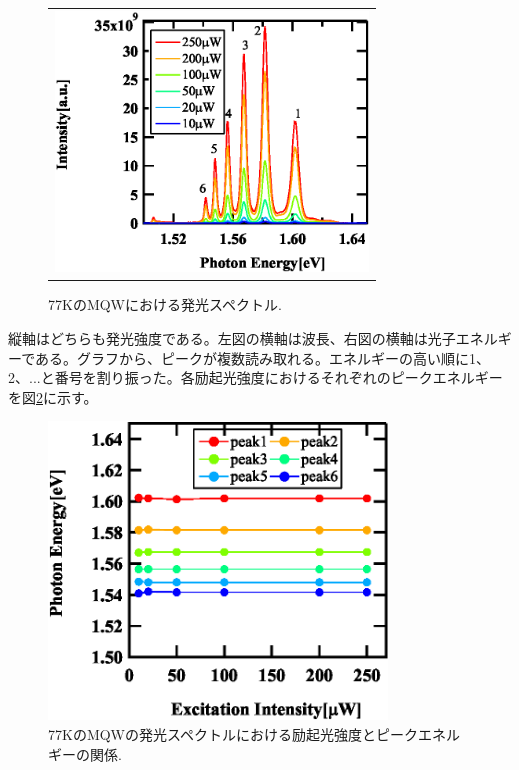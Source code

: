 \documentclass[11pt,a4j]{jsarticle}
\begin{document}
\begin{enumerate}
\begin{figure}[ht]
\begin{tabular}{c}
         \begin{minipage}{0.5\hsize}
          \centering
          \includegraphics[clip,width=8.3cm]{start2_MQW_77K_Spectrum_eV.eps}
         \end{minipage}
        \end{tabular}
        \caption{77KのMQWにおける発光スペクトル.}
        \label{fig_mqw_77_spec1}

       \end{figure}


       縦軸はどちらも発光強度である。左図の横軸は波長、右図の横軸は光子エネルギーである。グラフから、ピークが複数読み取れる。エネルギーの高い順に1、2、...と番号を割り振った。各励起光強度におけるそれぞれのピークエネルギーを図\ref{fig_mqw_77_peak1}に示す。

       \begin{figure}[ht]
        \centering
        \includegraphics[clip,width=9cm]{start2_MQW_77K_Peak.eps}
        \caption{77KのMQWの発光スペクトルにおける励起光強度とピークエネルギーの関係.}
        \label{fig_mqw_77_peak1}
       \end{figure}


\end{enumerate}
\end{document}
